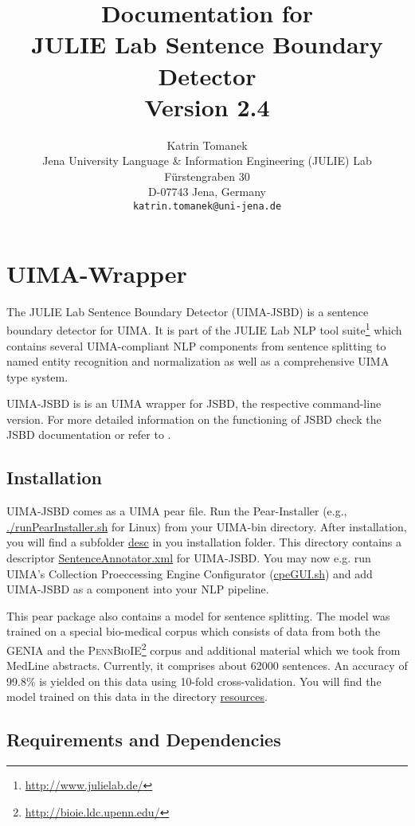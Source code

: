 \documentclass[11pt,a4paper,halfparskip]{scrartcl}
\title{\small{Documentation for}\\\huge JULIE Lab Sentence Boundary Detector\\\vspace{3mm}\small{Version 2.4}}
\author{\normalsize Katrin Tomanek\\
  \normalsize  Jena University Language \& Information Engineering (JULIE) Lab\\
  \normalsize F\"urstengraben 30 \\
  \normalsize D-07743 Jena, Germany\\
  {\normalsize \tt katrin.tomanek@uni-jena.de} }
\date{}
\begin{document}
\maketitle
\tableofcontents

\section{UIMA-Wrapper}



The JULIE Lab Sentence Boundary Detector (UIMA-JSBD) is a sentence
boundary detector for UIMA.  It is part of the JULIE Lab NLP tool
suite\footnote{\url{http://www.julielab.de/}} which contains several
UIMA-compliant NLP components from sentence splitting to named entity
recognition and normalization as well as a comprehensive UIMA type
system.

UIMA-JSBD is is an UIMA wrapper for JSBD, the respective command-line
version. For more detailed information on the functioning of JSBD
check the JSBD documentation or refer to \cite{Tomanek2007a}.

\subsection{Installation}

UIMA-JSBD comes as a UIMA pear file. Run the Pear-Installer (e.g.,
\url{./runPearInstaller.sh} for Linux) from your UIMA-bin directory.
After installation, you will find a subfolder \url{desc} in you
installation folder. This directory contains a descriptor
\url{SentenceAnnotator.xml} for UIMA-JSBD. You may now e.g. run UIMA's
Collection Proeccessing Engine Configurator (\url{cpeGUI.sh}) and add
UIMA-JSBD as a component into your NLP pipeline.

This pear package also contains a model for sentence splitting. The
model was trained on a special bio-medical corpus which consists of
data from both the GENIA \cite{Ohta2002} and the
\textsc{PennBioIE}\footnote{\url{http://bioie.ldc.upenn.edu/}} corpus
and additional material which we took from MedLine abstracts.
Currently, it comprises about 62000 sentences. An accuracy of 99.8\%
is yielded on this data using 10-fold cross-validation.  You will find
the model trained on this data in the directory \url{resources}.


\subsection{Requirements and Dependencies}
\end{document}
